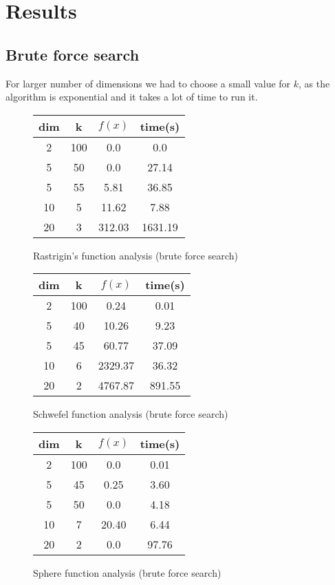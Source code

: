\documentclass{article}
\begin{document}
\clearpage

\section{Results}

\subsection{Brute force search}

For larger number of dimensions we had to choose a small value for $k$, as the algorithm is exponential and it takes a lot of time to run it.

\begin{figure}[!h]
	\centering
	\begin{tabular}{|| c | c | c | c || }
		\hline
		dim & k & $f(x)$ & time(s) \\ \hline \hline
		2 & 100 & 0.0 & 0.0 \\ \hline
		5 & 50 & 0.0 & 27.14 \\ \hline
		5 & 55 & 5.81 & 36.85 \\ \hline
		10 & 5 & 11.62 & 7.88 \\ \hline
		20 & 3 & 312.03 & 1631.19 \\ \hline
	\end{tabular}
	\caption{Rastrigin's function analysis (brute force search)}
\end{figure}

\begin{figure}[!h]
	\centering
	\begin{tabular}{|| c | c | c | c || }
		\hline
		dim & k & $f(x)$ & time(s) \\ \hline \hline
		2 & 100 & 0.24 & 0.01 \\ \hline
		5 & 40 & 10.26 & 9.23 \\ \hline
		5 & 45 & 60.77 & 37.09 \\ \hline
		10 & 6 & 2329.37 & 36.32 \\ \hline
		20 & 2 & 4767.87 & 891.55 \\ \hline
	\end{tabular}
	\caption{Schwefel function analysis (brute force search)}
\end{figure}

\begin{figure}[!h]
	\centering
	\begin{tabular}{|| c | c | c | c || }
		\hline
		dim & k & $f(x)$ & time(s) \\ \hline \hline
		2 & 100 & 0.0 & 0.01 \\ \hline
		5 & 45 & 0.25 & 3.60 \\ \hline
		5 & 50 & 0.0 & 4.18 \\ \hline
		10 & 7 & 20.40 & 6.44 \\ \hline
		20 & 2 & 0.0 & 97.76 \\ \hline
	\end{tabular}
	\caption{Sphere function analysis (brute force search)}
\end{figure}
\end{document}
